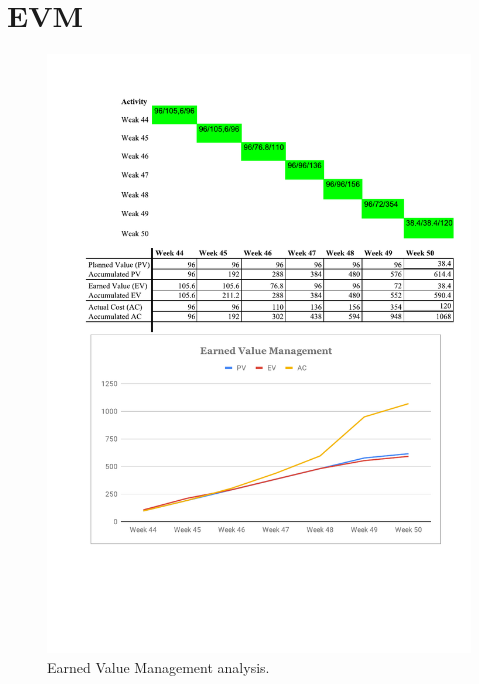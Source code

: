 \documentclass[11pt, titlepage]{article} %
\begin{document}
\section{EVM}
\begin{figure}[h]
     \centering
     \includegraphics[scale=0.8]{evm.pdf}
     \caption{Earned Value Management analysis.}
     \label{fig:evm}
\end{figure}

\end{document}
